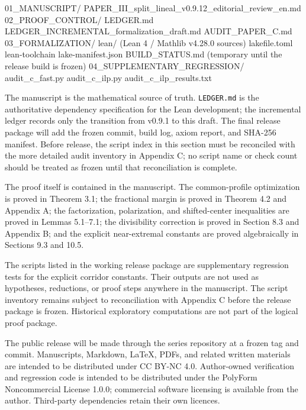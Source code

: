 \documentclass[
  11pt,
]{article}
\newenvironment{Shaded}{}{}
\newcommand{\NormalTok}[1]{#1}
\begin{document}
\begin{Shaded}
\begin{Highlighting}[]
\NormalTok{01\_MANUSCRIPT/}
\NormalTok{    PAPER\_III\_split\_lineal\_v0.9.12\_editorial\_review\_en.md}
\NormalTok{02\_PROOF\_CONTROL/}
\NormalTok{    LEDGER.md}
\NormalTok{    LEDGER\_INCREMENTAL\_formalization\_draft.md}
\NormalTok{    AUDIT\_PAPER\_C.md}
\NormalTok{03\_FORMALIZATION/}
\NormalTok{    lean/                         (Lean 4 / Mathlib v4.28.0 sources)}
\NormalTok{    lakefile.toml}
\NormalTok{    lean{-}toolchain}
\NormalTok{    lake{-}manifest.json}
\NormalTok{    BUILD\_STATUS.md               (temporary until the release build is frozen)}
\NormalTok{04\_SUPPLEMENTARY\_REGRESSION/}
\NormalTok{    audit\_c\_fast.py}
\NormalTok{    audit\_c\_ilp.py}
\NormalTok{    audit\_c\_ilp\_results.txt}
\end{Highlighting}
\end{Shaded}

The manuscript is the mathematical source of truth. \texttt{LEDGER.md} is the authoritative dependency specification for the Lean development; the incremental ledger records only the transition from v0.9.1 to this draft. The final release package will add the frozen commit, build log, axiom report, and SHA-256 manifest. Before release, the script index in this section must be reconciled with the more detailed audit inventory in Appendix C; no script name or check count should be treated as frozen until that reconciliation is complete.

The proof itself is contained in the manuscript. The common-profile optimization is proved in Theorem 3.1; the fractional margin is proved in Theorem 4.2 and Appendix A; the factorization, polarization, and shifted-center inequalities are proved in Lemmas 5.1--7.1; the divisibility correction is proved in Section 8.3 and Appendix B; and the explicit near-extremal constants are proved algebraically in Sections 9.3 and 10.5.

The scripts listed in the working release package are supplementary regression tests for the explicit corridor constants. Their outputs are not used as hypotheses, reductions, or proof steps anywhere in the manuscript. The script inventory remains subject to reconciliation with Appendix C before the release package is frozen. Historical exploratory computations are not part of the logical proof package.

The public release will be made through the series repository at a frozen tag and commit. Manuscripts, Markdown, LaTeX, PDFs, and related written materials are intended to be distributed under CC BY-NC 4.0. Author-owned verification and regression code is intended to be distributed under the PolyForm Noncommercial License 1.0.0; commercial software licensing is available from the author. Third-party dependencies retain their own licences.
\end{document}
